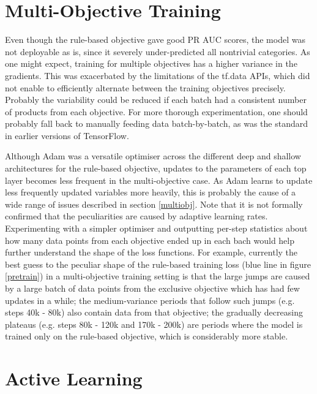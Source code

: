 \section{Multi-Objective Training}

Even though the rule-based objective gave good PR AUC scores, the model was not deployable as is, since it severely under-predicted all nontrivial categories.
As one might expect, training for multiple objectives has a higher variance in the gradients.
This was exacerbated by the limitations of the tf.data APIs, which did not enable to efficiently alternate between the training objectives precisely.
Probably the variability could be reduced if each batch had a consistent number of products from each objective.
For more thorough experimentation, one should probably fall back to manually feeding data batch-by-batch, as was the standard in earlier versions of TensorFlow.

Although Adam was a versatile optimiser across the different deep and shallow architectures for the rule-based objective, updates to the parameters of each top layer becomes less frequent in the multi-objective case.
As Adam learns to update less frequently updated variables more heavily, this is probably the cause of a wide range of issues described in section \ref{multiobj}.
Note that it is not formally confirmed that the peculiarities are caused by adaptive learning rates.
Experimenting with a simpler optimiser and outputting per-step statistics about how many data points from each objective ended up in each bach would help further understand the shape of the loss functions.
For example, currently the best guess to the peculiar shape of the rule-based training loss (blue line in figure \ref{pretrain}) in a multi-objective training setting is that the large jumps are caused by a large batch of data points from the exclusive objective which has had few updates in a while; the medium-variance periods that follow such jumps (e.g. steps 40k - 80k) also contain data from that objective; the gradually decreasing plateaus (e.g. steps 80k - 120k and 170k - 200k) are periods where the model is trained only on the rule-based objective, which is considerably more stable.



\section{Active Learning}

